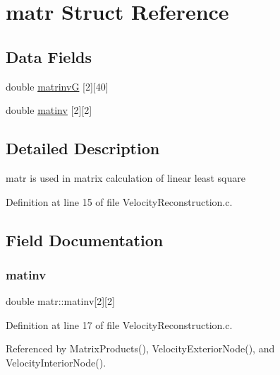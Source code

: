 \hypertarget{structmatr}{}\section{matr Struct Reference}
\label{structmatr}
\subsection*{Data Fields}
\begin{DoxyCompactItemize}
\item 
double \mbox{\hyperlink{structmatr_a2233efa6510134d01a3a0a0245f5d631}{matrinvG}} \mbox{[}2\mbox{]}\mbox{[}40\mbox{]}
\item 
double \mbox{\hyperlink{structmatr_a70ef628f861867c49550cad75d4c5b00}{matinv}} \mbox{[}2\mbox{]}\mbox{[}2\mbox{]}
\end{DoxyCompactItemize}


\subsection{Detailed Description}
matr is used in matrix calculation of linear least square 

Definition at line 15 of file Velocity\+Reconstruction.\+c.



\subsection{Field Documentation}
\mbox{\label{structmatr_a70ef628f861867c49550cad75d4c5b00}} 
\subsubsection{\texorpdfstring{matinv}{matinv}}
{\footnotesize\ttfamily double matr\+::matinv\mbox{[}2\mbox{]}\mbox{[}2\mbox{]}}



Definition at line 17 of file Velocity\+Reconstruction.\+c.



Referenced by Matrix\+Products(), Velocity\+Exterior\+Node(), and Velocity\+Interior\+Node().

\mbox{\label{structmatr_a2233efa6510134d01a3a0a0245f5d631}} 
